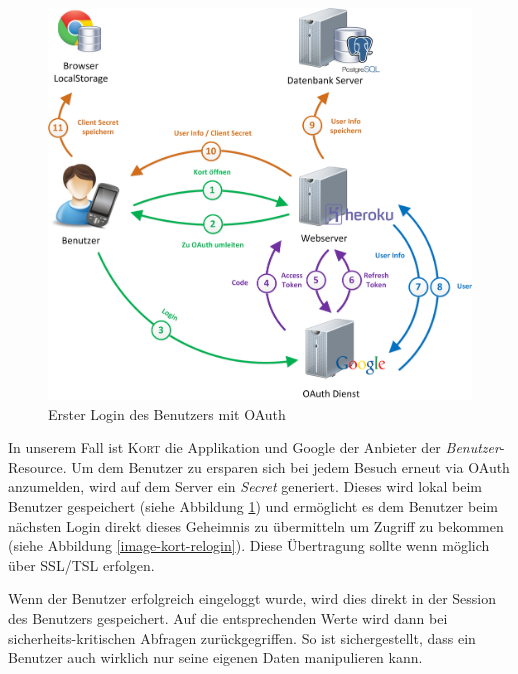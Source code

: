 \begin{figure}[H]
	\centering
	\includegraphics[width=\textwidth]{images/implementation/backend/kort-login}
	\caption{Erster Login des Benutzers mit OAuth}
	\label{image-kort-login}
\end{figure}

In unserem Fall ist \textsc{Kort} die Applikation und Google der Anbieter der \emph{Benutzer}-Resource.
Um dem Benutzer zu ersparen sich bei jedem Besuch erneut via \gls{OAuth} anzumelden, wird auf dem Server ein \emph{Secret} generiert.
Dieses wird lokal beim Benutzer gespeichert (siehe Abbildung \ref{image-kort-login}) und ermöglicht es dem Benutzer beim nächsten Login direkt dieses Geheimnis zu übermitteln um Zugriff zu bekommen (siehe Abbildung \ref{image-kort-relogin}).
Diese Übertragung sollte wenn möglich über SSL/TSL erfolgen.

Wenn der Benutzer erfolgreich eingeloggt wurde, wird dies direkt in der Session des Benutzers gespeichert.
Auf die entsprechenden Werte wird dann bei sicherheits-kritischen Abfragen zurückgegriffen.
So ist sichergestellt, dass ein Benutzer auch wirklich nur seine eigenen Daten manipulieren kann.

